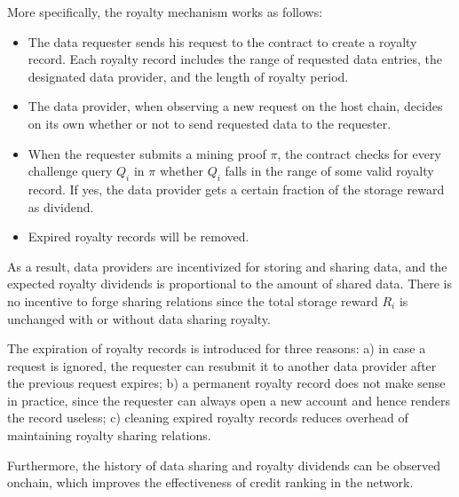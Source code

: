 More specifically, the royalty mechanism works as follows:
\begin{itemize}
 	\item The data requester sends his request to the \project contract to create a royalty record. Each royalty record includes the range of requested data entries, the designated data provider, and the length of royalty period.
 	
 	\item The data provider, when observing a new request on the host chain, decides on its own whether or not to send requested data to the requester.

 	\item When the requester submits a mining proof $\pi$, the \project contract checks for every \sproof challenge query $Q_i$  in $\pi$ whether $Q_i$ falls in the range of some valid royalty record.
 	If yes, the data provider gets a certain fraction of the storage reward as  dividend.


 	\item Expired royalty records will be removed.
\end{itemize}  

As a result, data providers are incentivized for storing and sharing data,
and the expected royalty dividends is proportional to the amount of shared data.
There is no incentive to forge sharing relations since the total storage reward $R_i$ is unchanged with or without data sharing royalty.

The expiration of royalty records is introduced for three reasons: a) in case a request is ignored, the requester can resubmit it to another data provider after the previous request expires;
b) a permanent royalty record does not make sense in practice, since the requester can always open a new account and hence renders the record useless;
c) cleaning expired royalty records reduces overhead of maintaining royalty sharing relations.

Furthermore, the history of data sharing and royalty dividends can be observed onchain, which improves the effectiveness of credit ranking in the \project network.





